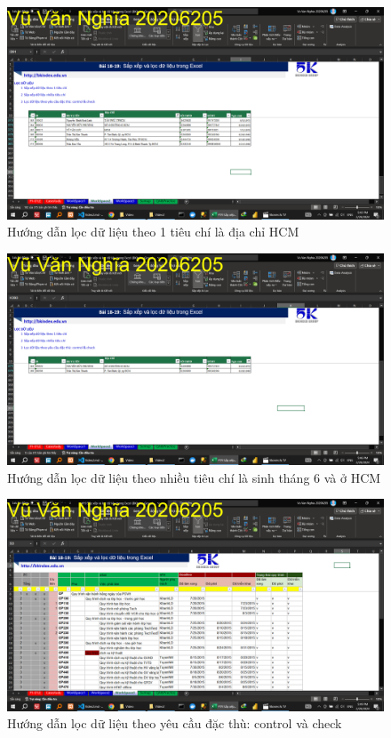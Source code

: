 \documentclass{article}
\begin{document}
\begin{figure}[h]
    \centering
    \includegraphics[scale = 0.15]{Video2/HuongDan/4.png}
    \caption{Hướng dẫn lọc dữ liệu theo 1 tiêu chí là địa chỉ HCM}
\end{figure}



\begin{figure}[h]
    \centering
    \includegraphics[scale = 0.15]{Video2/HuongDan/5.png}
    \caption{Hướng dẫn lọc dữ liệu theo nhiều tiêu chí là sinh tháng 6 và ở HCM}
\end{figure}




\begin{figure}[h]
    \centering
    \includegraphics[scale = 0.15]{Video2/HuongDan/6.png}
    \caption{Hướng dẫn lọc dữ liệu theo yêu cầu đặc thù: control và check}
\end{figure}
\end{document}
